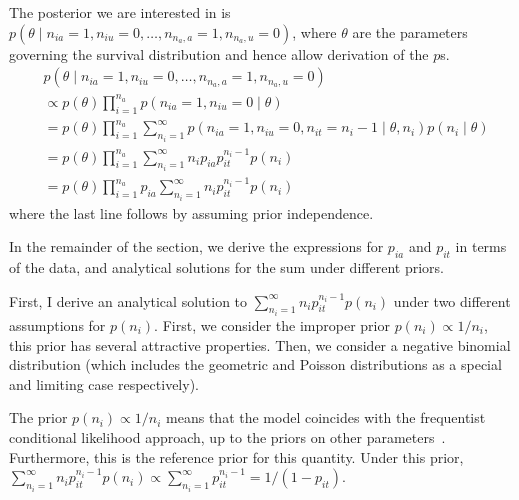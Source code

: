 \documentclass[thesis.tex]{subfiles}
\begin{document}
The posterior we are interested in is
$p(\theta \mid n_{ia} = 1, n_{iu} = 0, \dots, n_{n_a,a} = 1, n_{n_a,u} = 0)$,
where $\theta$ are the parameters governing the survival distribution
and hence allow derivation of the $p$s.
\begin{align}
&p(\theta \mid n_{ia} = 1, n_{iu} = 0, \dots, n_{n_a,a} = 1, n_{n_a,u} = 0) \\
&\propto p(\theta) \prod_{i=1}^{n_a} p(n_{ia} = 1, n_{iu} = 0 \mid \theta) \\
&= p(\theta) \prod_{i=1}^{n_a} \sum_{n_i=1}^\infty p(n_{ia} = 1, n_{iu} = 0, n_{it} = n_i - 1 \mid \theta, n_i) p(n_i \mid \theta) \\
&= p(\theta) \prod_{i=1}^{n_a} \sum_{n_i=1}^\infty n_i p_{ia} p_{it}^{n_i- 1} p(n_i) \\
&= p(\theta) \prod_{i=1}^{n_a} p_{ia} \sum_{n_i=1}^\infty n_i p_{it}^{n_i- 1} p(n_i)
\end{align}
where the last line follows by assuming prior independence.

In the remainder of the section, we derive the expressions for $p_{ia}$ and
$p_{it}$ in terms of the data, and analytical solutions for the sum
under different priors.

First, I derive an analytical solution to $\sum_{n_i=1}^\infty n_i p_{it}^{n_i- 1} p(n_i)$ under two different assumptions for $p(n_i)$.
First, we consider the improper prior $p(n_i) \propto 1/n_i$, this prior has several attractive properties.
Then, we consider a negative binomial distribution (which includes the geometric and Poisson distributions as a special and limiting case respectively).

The prior $p(n_i) \propto 1/n_i$ means that the model coincides with the frequentist conditional likelihood approach, up to the priors on other parameters~\cites[section 4.2]{dempsterMaximum}{heiseyModelling}[section 8.7.5]{gelmanBayesian}.
Furthermore, this is the reference prior for this quantity\autocite{heBayesiana}.
Under this prior,
$\sum_{n_i=1}^\infty n_i p_{it}^{n_i- 1} p(n_i) \propto \sum_{n_i=1}^\infty p_{it}^{n_i-1} = 1/(1-p_{it})$.
\end{document}
